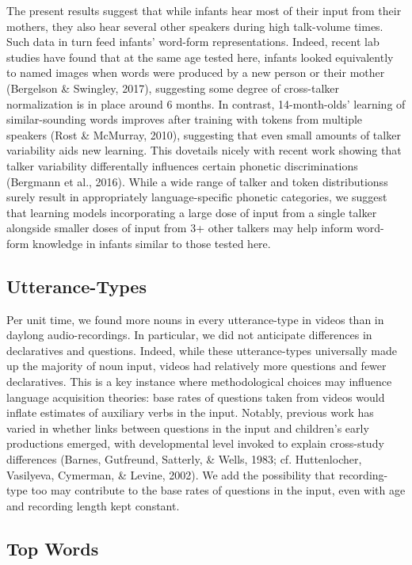 \documentclass[man]{apa6}
\theoremstyle{definition}
\theoremstyle{definition}
\theoremstyle{definition}
\theoremstyle{remark}
\begin{document}
The present results suggest that while infants hear most of their input
from their mothers, they also hear several other speakers during high
talk-volume times. Such data in turn feed infants' word-form
representations. Indeed, recent lab studies have found that at the same
age tested here, infants looked equivalently to named images when words
were produced by a new person or their mother (Bergelson \& Swingley,
2017), suggesting some degree of cross-talker normalization is in place
around 6 months. In contrast, 14-month-olds' learning of
similar-sounding words improves after training with tokens from multiple
speakers (Rost \& McMurray, 2010), suggesting that even small amounts of
talker variability aids new learning. This dovetails nicely with recent
work showing that talker variability differentally influences certain
phonetic discriminations (Bergmann et al., 2016). While a wide range of
talker and token distributionss surely result in appropriately
language-specific phonetic categories, we suggest that learning models
incorporating a large dose of input from a single talker alongside
smaller doses of input from 3+ other talkers may help inform word-form
knowledge in infants similar to those tested here.

\hypertarget{utterance-types}{%
\subsection{Utterance-Types}\label{utterance-types}}

Per unit time, we found more nouns in every utterance-type in videos
than in daylong audio-recordings. In particular, we did not anticipate
differences in declaratives and questions. Indeed, while these
utterance-types universally made up the majority of noun input, videos
had relatively more questions and fewer declaratives. This is a key
instance where methodological choices may influence language acquisition
theories: base rates of questions taken from videos would inflate
estimates of auxiliary verbs in the input. Notably, previous work has
varied in whether links between questions in the input and children's
early productions emerged, with developmental level invoked to explain
cross-study differences (Barnes, Gutfreund, Satterly, \& Wells, 1983;
cf. Huttenlocher, Vasilyeva, Cymerman, \& Levine, 2002). We add the
possibility that recording-type too may contribute to the base rates of
questions in the input, even with age and recording length kept
constant.

\hypertarget{top-words}{%
\subsection{Top Words}\label{top-words}}
\end{document}
